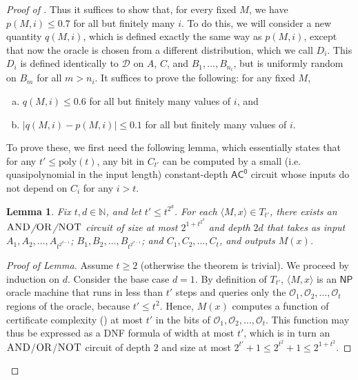 \documentclass[10pt,a4paper]{article}
\newtheorem{lemma}[theorem]{Lemma}
\newcommand{\Naturals}{\mathbb{N}}
\newcommand{\poly}{\mathrm{poly}}
\newcommand{\AND}{\normalfont\textsc{AND}} %
\newcommand{\OR}{\normalfont\textsc{OR}}
\newcommand{\NOT}{\normalfont\textsc{NOT}}
\begin{document}
\begin{proof}[Proof of ]
\noindent Thus it suffices to show that, for every fixed $M$, we have $p(M,i)\leq 0.7$ for all but finitely many $i$. To do this, we will consider a new quantity $q(M,i)$, which is defined exactly the same way as $p(M,i)$, except that now the oracle is chosen from a different distribution, which we call $D_i$. This $D_i$ is defined identically to $\mathcal{D}$ on $A$, $C$, and $B_1, \ldots, B_{n_i}$, but is uniformly random on $B_m$ for all $m > n_i$. It suffices to prove the following: for any fixed $M$,
\begin{enumerate}[(a)]
    \item $q(M,i)\leq 0.6$ for all but finitely many values of $i$, and
    \item $|q(M,i)-p(M,i)|\leq 0.1$ for all but finitely many values of $i$.
\end{enumerate}

To prove these, we first need the following lemma, which essentially states that for any $t' \le \poly(t)$, any bit in $C_{t'}$ can be computed by a small (i.e. quasipolynomial in the input length) constant-depth $\mathsf{AC^0}$ circuit whose inputs do not depend on $C_i$ for any $i > t$.

\begin{lemma}
\label{lem:recursive_np_ac0}
Fix $t, d \in \Naturals$, and let $t' \le t^{2^d}$. For each $\langle M, x \rangle \in T_{t'}$, there exists an $\AND$/$\OR$/$\NOT$ circuit of size at most $2^{1 + t^{2^d}}$ and depth $2d$ that takes as input $A_1,A_2,\ldots,A_{t^{2^{d-1}}}$; $B_1,B_2,\ldots,B_{t^{2^{d-1}}}$; and $C_1,C_2,\ldots,C_{t}$, and outputs $M(x)$.
\end{lemma}

\begin{proof}[Proof of Lemma]
Assume $t \ge 2$ (otherwise the theorem is trivial). We proceed by induction on $d$. Consider the base case $d = 1$. By definition of $T_{t'}$, $\langle M, x \rangle$ is an $\mathsf{NP}$ oracle machine that runs in less than $t'$ steps and queries only the $\mathcal{O}_1,\mathcal{O}_2,\ldots,\mathcal{O}_{t}$ regions of the oracle, because $t' \le t^2$. Hence, $M(x)$ computes a function of certificate complexity () at most $t'$ in the bits of $\mathcal{O}_1,\mathcal{O}_2,\ldots,\mathcal{O}_{t}$. This function may thus be expressed as a DNF formula of width at most $t'$, which is in turn an $\AND$/$\OR$/$\NOT$ circuit of depth $2$ and size at most $2^{t'} + 1 \le 2^{t^2} + 1 \le 2^{1 + t^2}$.


\end{proof}
\end{proof}
\end{document}
